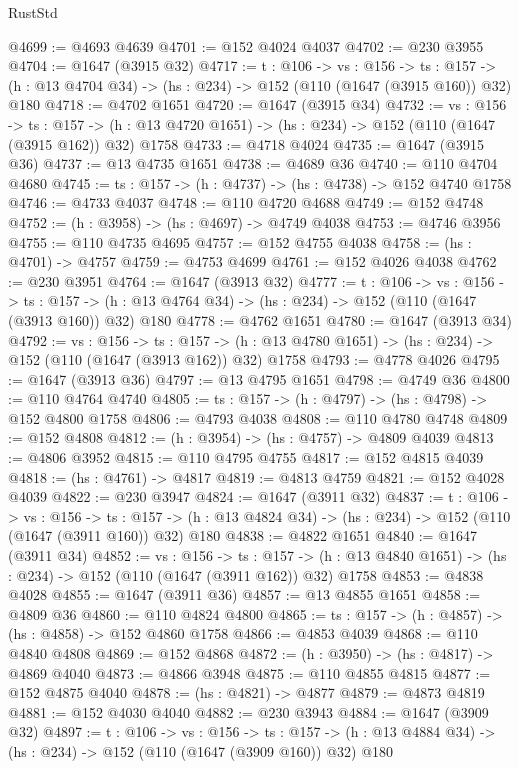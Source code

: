 \begin{lexlean}{RustStd}
\begin{coremodule}
@4699 := @4693 @4639
@4701 := @152 @4024 @4037
@4702 := @230 @3955
@4704 := @1647 (@3915 @32)
@4717 := {t : @106} ->
  {vs : @156} ->
  {ts : @157} -> (h : @13 @4704 @34) -> (hs : @234) -> @152 (@110 (@1647 (@3915 @160)) @32) @180
@4718 := @4702 @1651
@4720 := @1647 (@3915 @34)
@4732 := {vs : @156} ->
  {ts : @157} -> (h : @13 @4720 @1651) -> (hs : @234) -> @152 (@110 (@1647 (@3915 @162)) @32) @1758
@4733 := @4718 @4024
@4735 := @1647 (@3915 @36)
@4737 := @13 @4735 @1651
@4738 := @4689 @36
@4740 := @110 @4704 @4680
@4745 := {ts : @157} -> (h : @4737) -> (hs : @4738) -> @152 @4740 @1758
@4746 := @4733 @4037
@4748 := @110 @4720 @4688
@4749 := @152 @4748
@4752 := (h : @3958) -> (hs : @4697) -> @4749 @4038
@4753 := @4746 @3956
@4755 := @110 @4735 @4695
@4757 := @152 @4755 @4038
@4758 := (hs : @4701) -> @4757
@4759 := @4753 @4699
@4761 := @152 @4026 @4038
@4762 := @230 @3951
@4764 := @1647 (@3913 @32)
@4777 := {t : @106} ->
  {vs : @156} ->
  {ts : @157} -> (h : @13 @4764 @34) -> (hs : @234) -> @152 (@110 (@1647 (@3913 @160)) @32) @180
@4778 := @4762 @1651
@4780 := @1647 (@3913 @34)
@4792 := {vs : @156} ->
  {ts : @157} -> (h : @13 @4780 @1651) -> (hs : @234) -> @152 (@110 (@1647 (@3913 @162)) @32) @1758
@4793 := @4778 @4026
@4795 := @1647 (@3913 @36)
@4797 := @13 @4795 @1651
@4798 := @4749 @36
@4800 := @110 @4764 @4740
@4805 := {ts : @157} -> (h : @4797) -> (hs : @4798) -> @152 @4800 @1758
@4806 := @4793 @4038
@4808 := @110 @4780 @4748
@4809 := @152 @4808
@4812 := (h : @3954) -> (hs : @4757) -> @4809 @4039
@4813 := @4806 @3952
@4815 := @110 @4795 @4755
@4817 := @152 @4815 @4039
@4818 := (hs : @4761) -> @4817
@4819 := @4813 @4759
@4821 := @152 @4028 @4039
@4822 := @230 @3947
@4824 := @1647 (@3911 @32)
@4837 := {t : @106} ->
  {vs : @156} ->
  {ts : @157} -> (h : @13 @4824 @34) -> (hs : @234) -> @152 (@110 (@1647 (@3911 @160)) @32) @180
@4838 := @4822 @1651
@4840 := @1647 (@3911 @34)
@4852 := {vs : @156} ->
  {ts : @157} -> (h : @13 @4840 @1651) -> (hs : @234) -> @152 (@110 (@1647 (@3911 @162)) @32) @1758
@4853 := @4838 @4028
@4855 := @1647 (@3911 @36)
@4857 := @13 @4855 @1651
@4858 := @4809 @36
@4860 := @110 @4824 @4800
@4865 := {ts : @157} -> (h : @4857) -> (hs : @4858) -> @152 @4860 @1758
@4866 := @4853 @4039
@4868 := @110 @4840 @4808
@4869 := @152 @4868
@4872 := (h : @3950) -> (hs : @4817) -> @4869 @4040
@4873 := @4866 @3948
@4875 := @110 @4855 @4815
@4877 := @152 @4875 @4040
@4878 := (hs : @4821) -> @4877
@4879 := @4873 @4819
@4881 := @152 @4030 @4040
@4882 := @230 @3943
@4884 := @1647 (@3909 @32)
@4897 := {t : @106} ->
  {vs : @156} ->
  {ts : @157} -> (h : @13 @4884 @34) -> (hs : @234) -> @152 (@110 (@1647 (@3909 @160)) @32) @180

\end{coremodule}
\end{lexlean}
